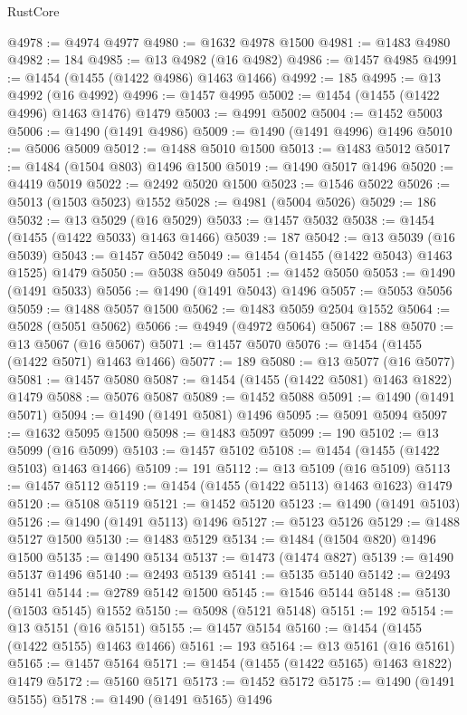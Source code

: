 \begin{lexlean}{RustCore}
\begin{coremodule}
@4978 := @4974 @4977
@4980 := @1632 @4978 @1500
@4981 := @1483 @4980
@4982 := 184
@4985 := @13 @4982 (@16 @4982)
@4986 := @1457 @4985
@4991 := @1454 (@1455 (@1422 @4986) @1463 @1466)
@4992 := 185
@4995 := @13 @4992 (@16 @4992)
@4996 := @1457 @4995
@5002 := @1454 (@1455 (@1422 @4996) @1463 @1476) @1479
@5003 := @4991 @5002
@5004 := @1452 @5003
@5006 := @1490 (@1491 @4986)
@5009 := @1490 (@1491 @4996) @1496
@5010 := @5006 @5009
@5012 := @1488 @5010 @1500
@5013 := @1483 @5012
@5017 := @1484 (@1504 @803) @1496 @1500
@5019 := @1490 @5017 @1496
@5020 := @4419 @5019
@5022 := @2492 @5020 @1500
@5023 := @1546 @5022
@5026 := @5013 (@1503 @5023) @1552
@5028 := @4981 (@5004 @5026)
@5029 := 186
@5032 := @13 @5029 (@16 @5029)
@5033 := @1457 @5032
@5038 := @1454 (@1455 (@1422 @5033) @1463 @1466)
@5039 := 187
@5042 := @13 @5039 (@16 @5039)
@5043 := @1457 @5042
@5049 := @1454 (@1455 (@1422 @5043) @1463 @1525) @1479
@5050 := @5038 @5049
@5051 := @1452 @5050
@5053 := @1490 (@1491 @5033)
@5056 := @1490 (@1491 @5043) @1496
@5057 := @5053 @5056
@5059 := @1488 @5057 @1500
@5062 := @1483 @5059 @2504 @1552
@5064 := @5028 (@5051 @5062)
@5066 := @4949 (@4972 @5064)
@5067 := 188
@5070 := @13 @5067 (@16 @5067)
@5071 := @1457 @5070
@5076 := @1454 (@1455 (@1422 @5071) @1463 @1466)
@5077 := 189
@5080 := @13 @5077 (@16 @5077)
@5081 := @1457 @5080
@5087 := @1454 (@1455 (@1422 @5081) @1463 @1822) @1479
@5088 := @5076 @5087
@5089 := @1452 @5088
@5091 := @1490 (@1491 @5071)
@5094 := @1490 (@1491 @5081) @1496
@5095 := @5091 @5094
@5097 := @1632 @5095 @1500
@5098 := @1483 @5097
@5099 := 190
@5102 := @13 @5099 (@16 @5099)
@5103 := @1457 @5102
@5108 := @1454 (@1455 (@1422 @5103) @1463 @1466)
@5109 := 191
@5112 := @13 @5109 (@16 @5109)
@5113 := @1457 @5112
@5119 := @1454 (@1455 (@1422 @5113) @1463 @1623) @1479
@5120 := @5108 @5119
@5121 := @1452 @5120
@5123 := @1490 (@1491 @5103)
@5126 := @1490 (@1491 @5113) @1496
@5127 := @5123 @5126
@5129 := @1488 @5127 @1500
@5130 := @1483 @5129
@5134 := @1484 (@1504 @820) @1496 @1500
@5135 := @1490 @5134
@5137 := @1473 (@1474 @827)
@5139 := @1490 @5137 @1496
@5140 := @2493 @5139
@5141 := @5135 @5140
@5142 := @2493 @5141
@5144 := @2789 @5142 @1500
@5145 := @1546 @5144
@5148 := @5130 (@1503 @5145) @1552
@5150 := @5098 (@5121 @5148)
@5151 := 192
@5154 := @13 @5151 (@16 @5151)
@5155 := @1457 @5154
@5160 := @1454 (@1455 (@1422 @5155) @1463 @1466)
@5161 := 193
@5164 := @13 @5161 (@16 @5161)
@5165 := @1457 @5164
@5171 := @1454 (@1455 (@1422 @5165) @1463 @1822) @1479
@5172 := @5160 @5171
@5173 := @1452 @5172
@5175 := @1490 (@1491 @5155)
@5178 := @1490 (@1491 @5165) @1496

\end{coremodule}
\end{lexlean}
